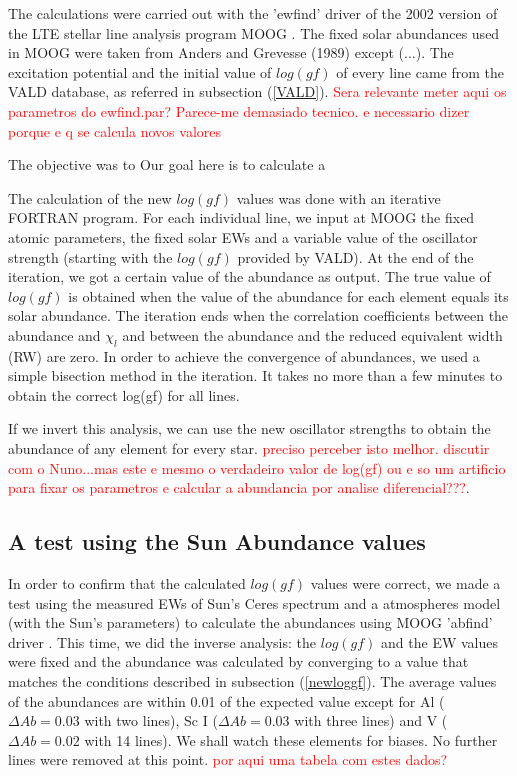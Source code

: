 \documentclass[dvips,12pt,a4paper]{report}
\begin{document}
{The calculations were carried out with the 'ewfind' driver of the 2002 version of the LTE stellar line analysis program MOOG \citep{Sneden-1973}. The fixed solar abundances used in MOOG were taken from Anders and Grevesse (1989) except (...). The excitation potential and the initial value of $log(gf)$ of every line came from the VALD database, as referred in subsection (\ref{VALD}). \textcolor{red}{Sera relevante meter aqui os parametros do ewfind.par? Parece-me demasiado tecnico. e necessario dizer porque e q se calcula novos valores}


The objective was to 
Our goal here is to calculate a 

The calculation of the new $log(gf)$ values was done with an iterative FORTRAN program. For each individual line, we input at MOOG the fixed atomic parameters, the fixed solar EWs and a variable value of the oscillator strength (starting with the $log(gf)$ provided by VALD). At the end of the iteration, we got a certain value of the abundance as output. The true value of $log(gf)$ is obtained when the value of the abundance for each element equals its solar abundance. The iteration ends when the correlation coefficients between the abundance and $\chi_l$ and between the abundance and the reduced equivalent width (RW) are zero. In order to achieve the convergence of abundances, we used a simple bisection method in the iteration. It takes no more than a few minutes to obtain the correct log(gf) for all lines. 

If we invert this analysis, we can use the new oscillator strengths to obtain the abundance of any element for every star. \textcolor{red}{preciso perceber isto melhor. discutir com o Nuno...mas este e mesmo o verdadeiro valor de log(gf) ou e so um artificio para fixar os parametros e calcular a abundancia por analise diferencial???}.

\subsection {A test using the Sun Abundance values}

In order to confirm that the calculated $log(gf)$ values were correct, we made a test using the measured EWs of Sun's Ceres spectrum and a \citet{Kurucz-1993} atmospheres model (with the Sun's parameters) to calculate the abundances using MOOG 'abfind' driver . This time, we did the inverse analysis: the $log(gf)$ and the EW values were fixed and the abundance was calculated by converging to a value that matches the conditions described in subsection (\ref{newloggf}). The average values of the abundances are within 0.01 of the expected value except for Al ($\Delta Ab= 0.03$ with two lines), Sc I ($\Delta Ab=0.03$ with three lines) and V ($\Delta Ab=0.02$ with 14 lines). We shall watch these elements for biases. No further lines were removed at this point. \textcolor{red}{por aqui uma tabela com estes dados?}

}
\end{document}

